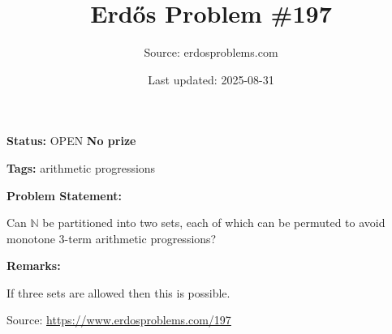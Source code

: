 \documentclass{article}
\title{Erd\H{o}s Problem \#197}
\date{Last updated: 2025-08-31}
\author{Source: erdosproblems.com}
\begin{document}
\maketitle

\noindent\textbf{Status:} OPEN \quad \textbf{No prize}

\noindent\textbf{Tags:} arithmetic progressions

\medskip
\noindent\textbf{Problem Statement:}

Can $\mathbb{N}$ be partitioned into two sets, each of which can be permuted to avoid monotone 3-term arithmetic progressions?

\bigskip
\noindent\textbf{Remarks:}

If three sets are allowed then this is possible.

\bigskip
\noindent\small{Source: \url{https://www.erdosproblems.com/197}}
\end{document}
